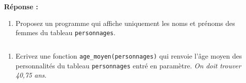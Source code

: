 \documentclass[12pt]{book}
\begin{document}
    \textbf{Réponse :}

    \begin{enumerate}
\def\labelenumi{\arabic{enumi}.}
\setcounter{enumi}{4}
\tightlist
\item
  Proposez un programme qui affiche uniquement les noms et prénoms des
  femmes du tableau \texttt{personnages}.
\end{enumerate}

    \begin{tcolorbox}[breakable, size=fbox, boxrule=1pt, pad at break*=1mm,colback=cellbackground, colframe=cellborder]
\begin{Verbatim}[commandchars=\\\{\}]

\end{Verbatim}
\end{tcolorbox}

    \begin{enumerate}
\def\labelenumi{\arabic{enumi}.}
\setcounter{enumi}{5}
\tightlist
\item
  Ecrivez une fonction \texttt{age\_moyen(personnages)} qui renvoie
  l'âge moyen des personnalités du tableau \texttt{personnages} entré en
  paramètre. \emph{On doit trouver 40,75 ans}.
\end{enumerate}

    \begin{tcolorbox}[breakable, size=fbox, boxrule=1pt, pad at break*=1mm,colback=cellbackground, colframe=cellborder]
\begin{Verbatim}[commandchars=\\\{\}]

\end{Verbatim}
\end{tcolorbox}


    
    
    
\end{document}
